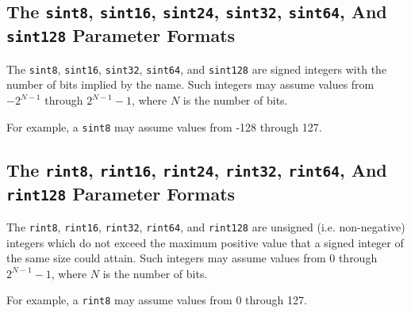 \subsection{The \texttt{sint8}, \texttt{sint16},
            \texttt{sint24}, 
            \texttt{sint32}, \texttt{sint64}, And
            \texttt{sint128} Parameter Formats}
\label{ctin0:sccl0:ssig0}

The \texttt{sint8}, \texttt{sint16},
\texttt{sint32}, \texttt{sint64}, and
\texttt{sint128} are signed integers with the 
number of bits implied by the name.  Such integers
may assume values from $-2^{N-1}$ through $2^{N-1} - 1$,
where $N$ is the number of bits.

For example, a \texttt{sint8} may assume values from
-128 through 127.


\subsection{The \texttt{rint8}, \texttt{rint16}, \texttt{rint24},
            \texttt{rint32}, \texttt{rint64}, And
            \texttt{rint128} Parameter Formats}
\label{ctin0:sccl0:srig0}

The \texttt{rint8}, \texttt{rint16},
\texttt{rint32}, \texttt{rint64}, and
\texttt{rint128} are unsigned (i.e. non-negative)
integers which do not exceed the maximum positive
value that a signed integer of the same size could
attain.  Such integers may assume values from 0
through $2^{N-1} - 1$,
where $N$ is the number of bits.

For example, a \texttt{rint8} may assume values from
0 through 127.


